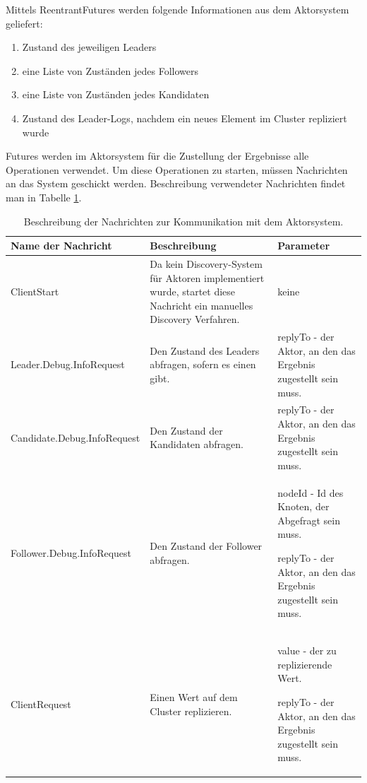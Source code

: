 Mittels ReentrantFutures werden folgende Informationen aus dem Aktorsystem geliefert:

\begin{enumerate}
	\item Zustand des jeweiligen Leaders
	
	\item eine Liste von Zuständen jedes Followers
	
	\item eine Liste von Zuständen jedes Kandidaten
	
	\item Zustand des Leader-Logs, nachdem ein neues Element im Cluster repliziert wurde
\end{enumerate}

Futures werden im Aktorsystem für die Zustellung der Ergebnisse alle Operationen verwendet. Um diese Operationen zu starten, müssen Nachrichten an das System geschickt werden. Beschreibung verwendeter Nachrichten findet man in Tabelle \ref{tab:operations}.

\begin{table} \centering
	\begin{tabular}{|p{5cm}|p{5cm}|p{5cm}|} 
		\hline
		\textbf{Name der Nachricht} & \textbf{Beschreibung} & \textbf{Parameter} \\
		
		\hline
		ClientStart & Da kein Discovery-System für Aktoren implementiert wurde, startet diese Nachricht ein manuelles Discovery Verfahren. & keine\\

		\hline
		Leader.Debug.InfoRequest & Den Zustand des Leaders abfragen, sofern es einen gibt. & replyTo - der Aktor, an den das Ergebnis zugestellt sein muss.\\
		
		\hline
		Candidate.Debug.InfoRequest & Den Zustand der Kandidaten abfragen. & replyTo - der Aktor, an den das Ergebnis zugestellt sein muss.\\
		
		\hline
		Follower.Debug.InfoRequest & Den Zustand der Follower abfragen. & nodeId - Id des Knoten, der Abgefragt sein muss.
		
		replyTo - der Aktor, an den das Ergebnis zugestellt sein muss.\\
		
		\hline
		ClientRequest & Einen Wert auf dem Cluster replizieren. & value - der zu replizierende Wert.
		
		replyTo - der Aktor, an den das Ergebnis zugestellt sein muss.\\
				
		\hline
	\end{tabular}
	\caption{Beschreibung der Nachrichten zur Kommunikation mit dem Aktorsystem.}
	\label{tab:operations}
\end{table}

